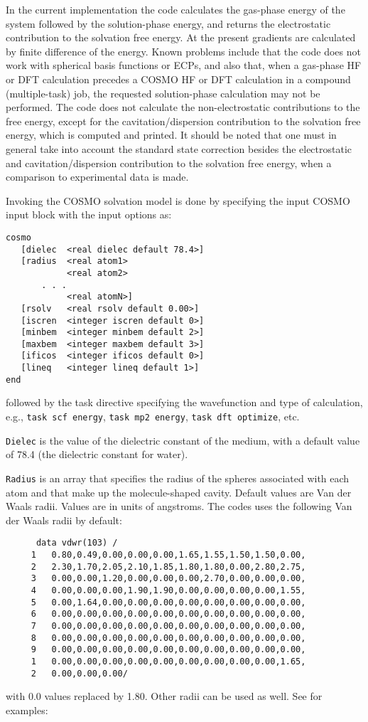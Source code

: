 In the current implementation the code
calculates the gas-phase energy of the system followed by the
solution-phase energy, and returns the electrostatic contribution
to the solvation free energy. 
At the present gradients are calculated by finite
difference of the energy.  Known problems include that the code does not 
work with spherical basis functions or ECPs, and also 
that, when a gas-phase HF or DFT calculation
precedes a COSMO HF or DFT calculation in a compound (multiple-task) job,
the requested solution-phase calculation may not be performed.
The code does not calculate the
non-electrostatic contributions to the free energy, except for
the cavitation/dispersion contribution to the solvation free energy,
which is computed and printed.
It should be noted that one must in general take into account 
the standard state correction besides the electrostatic
and cavitation/dispersion contribution to the solvation free energy,
when a comparison to experimental data is made.

Invoking the COSMO solvation model is done by specifying the input
COSMO input block with the input options as:
\begin{verbatim}
cosmo
   [dielec  <real dielec default 78.4>]
   [radius  <real atom1>
            <real atom2>
       . . .
            <real atomN>]
   [rsolv   <real rsolv default 0.00>]
   [iscren  <integer iscren default 0>]
   [minbem  <integer minbem default 2>]
   [maxbem  <integer maxbem default 3>]
   [ificos  <integer ificos default 0>]
   [lineq   <integer lineq default 1>]
end
\end{verbatim}
followed by the task directive specifying the wavefunction and
type of calculation, e.g., \verb+task scf energy+, \verb+task mp2 energy+,
\verb+task dft optimize+, etc.

\verb+Dielec+ is the value of the dielectric constant of the medium, 
with a default value of 78.4 (the dielectric constant for water).

\verb+Radius+ is an array that specifies the radius of the spheres
associated with each atom and that make up the molecule-shaped cavity.
Default values are Van der Waals radii. Values are in units of angstroms.
The codes uses the following Van der Waals radii by default:
\begin{verbatim}
      data vdwr(103) /
     1   0.80,0.49,0.00,0.00,0.00,1.65,1.55,1.50,1.50,0.00,
     2   2.30,1.70,2.05,2.10,1.85,1.80,1.80,0.00,2.80,2.75,
     3   0.00,0.00,1.20,0.00,0.00,0.00,2.70,0.00,0.00,0.00,
     4   0.00,0.00,0.00,1.90,1.90,0.00,0.00,0.00,0.00,1.55,
     5   0.00,1.64,0.00,0.00,0.00,0.00,0.00,0.00,0.00,0.00,
     6   0.00,0.00,0.00,0.00,0.00,0.00,0.00,0.00,0.00,0.00,
     7   0.00,0.00,0.00,0.00,0.00,0.00,0.00,0.00,0.00,0.00,
     8   0.00,0.00,0.00,0.00,0.00,0.00,0.00,0.00,0.00,0.00,
     9   0.00,0.00,0.00,0.00,0.00,0.00,0.00,0.00,0.00,0.00,
     1   0.00,0.00,0.00,0.00,0.00,0.00,0.00,0.00,0.00,1.65,
     2   0.00,0.00,0.00/
\end{verbatim}
with 0.0 values replaced by 1.80. Other radii can be used as well.
See for examples:

